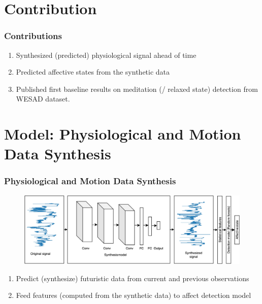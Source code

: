 \documentclass[unknownkeysallowed]{beamer}
\begin{document}
\section{Contribution}

\begin{frame}
\frametitle{Contributions}

\begin{enumerate}[-]
    \item Synthesized (predicted) physiological signal ahead of time
    
    \item Predicted affective states from the synthetic data
    
    \item Published first baseline results on meditation (/ relaxed state) detection from WESAD dataset.
\end{enumerate}

\end{frame}


\section{Model: Physiological and Motion Data Synthesis}

\begin{frame}
\frametitle{Physiological and Motion Data Synthesis}

\begin{figure}
  \centering
  \includegraphics[width=.85\textwidth]{figs/syn_framework.jpg}
  \label{fig:overview}
\end{figure}

\begin{enumerate}[Step 1.]
    \pause \item Predict (synthesize) futuristic data from current and previous observations
    \pause \item Feed features (computed from the synthetic data) to affect detection model
\end{enumerate}

\end{frame}
\end{document}
